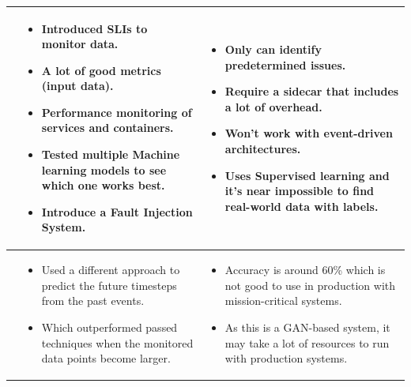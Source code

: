\begin{longtable}{| p{25mm} | p{62mm} | p{62mm} |}
    \cite{du2018anomaly} &
    \vspace{-8mm}
    \begin{itemize}[leftmargin=3mm,noitemsep,nolistsep] 
        \item Introduced SLIs to monitor data.
        \item A lot of good metrics (input data).
        \item Performance monitoring of services and containers.
        \item Tested multiple Machine learning models to see which one works best.
        \item Introduce a Fault Injection System.
        \vspace{-7mm}
    \end{itemize} &
    \vspace{-8mm}
    \begin{itemize}[leftmargin=3mm,noitemsep,nolistsep] 
        \item Only can identify predetermined issues.
        \item Require a sidecar that includes a lot of overhead.
        \item Won't work with event-driven architectures.
        \item Uses Supervised learning and it's near impossible to find real-world data with labels.
        \vspace{-7mm}
    \end{itemize} \\ \hline
    
    \cite{kumarage2019generative} &
    \vspace{-8mm}
    \begin{itemize}[leftmargin=3mm,noitemsep,nolistsep] 
        \item Used a different approach to predict the future timesteps from the past events.
        \item Which outperformed passed techniques when the monitored data points become larger.
        \vspace{-7mm}
    \end{itemize} &
    \vspace{-8mm}
    \begin{itemize}[leftmargin=3mm,noitemsep,nolistsep] 
        \item Accuracy is around 60\% which is not good to use in production with mission-critical systems.
        \item As this is a GAN-based system, it may take a lot of resources to run with production systems.
        \vspace{-7mm}
    \end{itemize} \\ \hline
    

\end{longtable}

